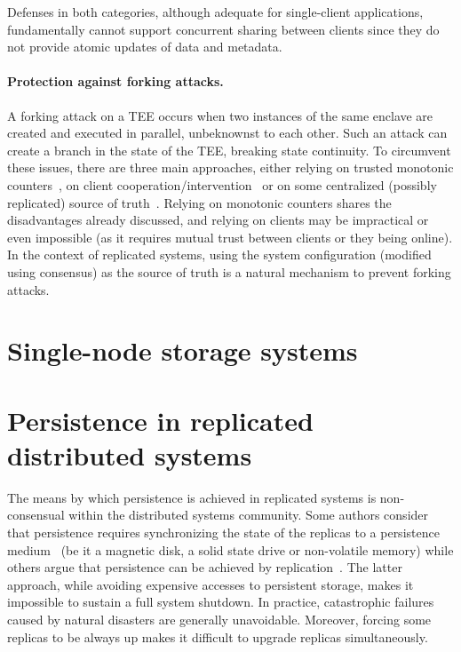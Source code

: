 Defenses in both categories, although adequate for single-client
applications, fundamentally cannot support concurrent sharing
between clients since they do not provide atomic updates of data
and metadata.

\paragraph{Protection against forking attacks.}
A forking attack on a TEE occurs when two instances of the same
enclave are created and executed in parallel, unbeknownst to each
other. Such an attack can create a branch in the state of the
TEE, breaking state continuity. To circumvent these issues, there
are three main approaches, either relying on trusted monotonic
counters~\cite{rote,ariadne,a2m,trinc,memoir},  on client
cooperation/intervention~\cite{fork_verify,fork_fail,fork_comm,fork_lcm,fork_sporc,fork_fs,fork_venus}
or  on some centralized (possibly replicated) source of
truth~\cite{haven}. Relying on monotonic counters shares the
disadvantages already discussed, and relying on clients may be
impractical or even impossible (as it requires mutual trust
between clients or they being online). In the context of
replicated systems, using the system configuration (modified
using consensus) as the source of truth is a natural mechanism to
prevent forking attacks.

\section{Single-node storage systems}

\section{Persistence in replicated distributed systems}

The means by which persistence is achieved in replicated
systems is non-consensual within the distributed systems
community. Some authors consider that persistence requires
synchronizing the state of the replicas to a persistence
medium~\cite{gaios} (be it a magnetic disk, a solid state drive or non-volatile
memory) while others argue that persistence can be achieved by
replication~\cite{pbft,byz_fault_tolerant,hq,zyzzyva}. The latter approach, while avoiding expensive
accesses to persistent storage, makes it impossible to sustain a
full system shutdown. In practice, catastrophic failures
caused by natural disasters are generally unavoidable.
Moreover, forcing some replicas to be always up
makes it difficult to upgrade replicas simultaneously.

